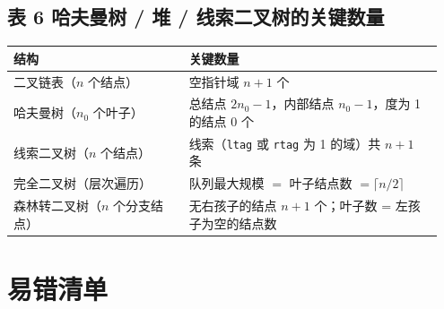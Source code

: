 \documentclass[11pt,openany,UTF8]{ctexbook}
\begin{document}
\subsection{表 6 哈夫曼树 / 堆 / 线索二叉树的关键数量}

\begingroup\small\setlength{\tabcolsep}{4.0pt}
\begin{longtable}{@{}L{0.3875\linewidth}L{0.5581\linewidth}@{}}
\toprule
\textbf{结构} & \textbf{关键数量} \\
\midrule
\endhead
二叉链表（$n$ 个结点） & 空指针域 $n+1$ 个 \\
哈夫曼树（$n_0$ 个叶子） & 总结点 $2n_0-1$，内部结点 $n_0-1$，度为 1 的结点 0 个 \\
线索二叉树（$n$ 个结点） & 线索（\texttt{ltag} 或 \texttt{rtag} 为 1 的域）共 $n+1$ 条 \\
完全二叉树（层次遍历） & 队列最大规模 $=$ 叶子结点数 $=\lceil n/2\rceil$ \\
森林转二叉树（$n$ 个分支结点） & 无右孩子的结点 $n+1$ 个；叶子数 = 左孩子为空的结点数 \\
\bottomrule
\end{longtable}
\endgroup

\section*{易错清单}
\end{document}
